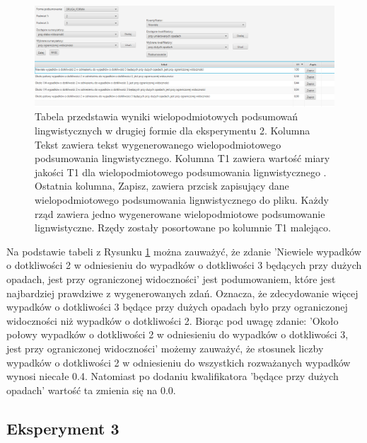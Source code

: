 \documentclass{classrep}
\begin{document}
\newpage

\begin{figure}[h!]
 \centering
 \includegraphics[width=15cm]{ex_wiel2_2.png}
 \vspace{-0.3cm}
 \caption{Tabela przedstawia wyniki wielopodmiotowych podsumowań lingwistycznych w drugiej formie dla eksperymentu 2. Kolumna Tekst zawiera tekst wygenerowanego wielopodmiotowego podsumowania lingwistycznego. Kolumna T1 zawiera wartość miary jakości T1 dla wielopodmiotowego podsumowania lignwistycznego \cite{niewiadomski19}. Ostatnia kolumna, Zapisz, zawiera przcisk zapisujący dane wielopodmiotowego podsumowania lignwistycznego do pliku. Każdy rząd zawiera jedno wygenerowane wielopodmiotowe podsumowanie lignwistyczne. Rzędy zostały posortowane po kolumnie T1 malejąco.  }
 \label{wykr_ex_wiel2_2}
\end{figure}



Na podstawie tabeli z Rysunku \ref{wykr_ex_wiel2_2} można zauważyć, że zdanie 'Niewiele wypadków o dotkliwości 2 w odniesieniu do wypadków o dotkliwości 3 będących przy dużych opadach, jest przy ograniczonej widoczności' jest podumowaniem, które jest najbardziej prawdziwe z wygenerowanych zdań. Oznacza, że zdecydowanie więcej wypadków o dotkliwości 3 będące przy dużych opadach było przy ograniczonej widoczności niż wypadków o dotkliwości 2. Biorąc pod uwagę zdanie: 'Około połowy wypadków o dotkliwości 2 w odniesieniu do wypadków o dotkliwości 3, jest przy ograniczonej widoczności' możemy zauważyć, że stosunek liczby wypadków o dotkliwości 2 w odniesieniu do wszystkich rozważanych wypadków wynosi niecałe 0.4. Natomiast po dodaniu kwalifikatora 'będące przy dużych opadach' wartość ta zmienia się na 0.0. 





\newpage
\subsection{Eksperyment 3}
\label{section:ex_wiel3}
\end{document}
